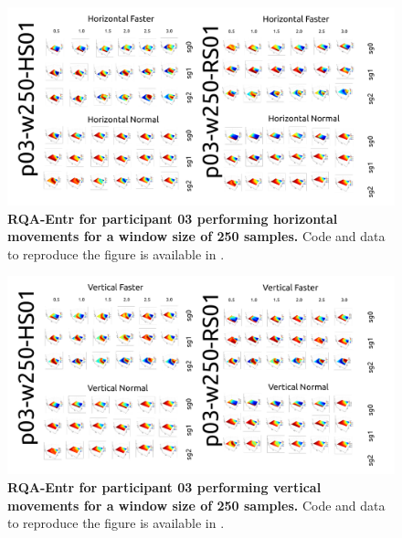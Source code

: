 \documentclass[12pt]{article}
\begin{document}


\newpage
\begin{figure}[ht!]
\centering
\includegraphics{sm-fig19}
    	\caption{
	{\bf RQA-Entr for participant 03 performing horizontal movements for a window size of 250 samples.}
	Code and data to reproduce the figure is available in \cite{srep2021}.
        }
    \label{fig-p03-H-w250}
\end{figure}
\begin{figure}[hb!]
\centering
\includegraphics{sm-fig20}
    	\caption{
	{\bf RQA-Entr for participant 03 performing vertical movements for a window size of 250 samples.}
	Code and data to reproduce the figure is available in \cite{srep2021}.
        }
    \label{fig-p03-V-w250}
\end{figure}
\end{document}
